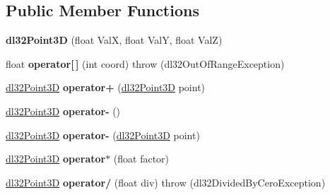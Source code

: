 \subsection*{Public Member Functions}
\begin{DoxyCompactItemize}
\item 
\hypertarget{structdl32_point3_d_a3dfca17d96b6cfa75a4110247c59c6e3}{{\bfseries dl32\-Point3\-D} (float Val\-X, float Val\-Y, float Val\-Z)}\label{structdl32_point3_d_a3dfca17d96b6cfa75a4110247c59c6e3}

\item 
\hypertarget{structdl32_point3_d_a066d3694ca763e334a21e962fc6315b9}{float {\bfseries operator\mbox{[}$\,$\mbox{]}} (int coord)  throw (dl32\-Out\-Of\-Range\-Exception)}\label{structdl32_point3_d_a066d3694ca763e334a21e962fc6315b9}

\item 
\hypertarget{structdl32_point3_d_aaad092a6e2481fdcb768b4f61bb8612d}{\hyperlink{structdl32_point3_d}{dl32\-Point3\-D} {\bfseries operator+} (\hyperlink{structdl32_point3_d}{dl32\-Point3\-D} point)}\label{structdl32_point3_d_aaad092a6e2481fdcb768b4f61bb8612d}

\item 
\hypertarget{structdl32_point3_d_a548a2681b98fbb0d2175ffd5a79da088}{\hyperlink{structdl32_point3_d}{dl32\-Point3\-D} {\bfseries operator-\/} ()}\label{structdl32_point3_d_a548a2681b98fbb0d2175ffd5a79da088}

\item 
\hypertarget{structdl32_point3_d_ac504bbd6cdc3b88366ef6a73f135dbb9}{\hyperlink{structdl32_point3_d}{dl32\-Point3\-D} {\bfseries operator-\/} (\hyperlink{structdl32_point3_d}{dl32\-Point3\-D} point)}\label{structdl32_point3_d_ac504bbd6cdc3b88366ef6a73f135dbb9}

\item 
\hypertarget{structdl32_point3_d_a86d23fa11f2b777bf680a983c3d56ab6}{\hyperlink{structdl32_point3_d}{dl32\-Point3\-D} {\bfseries operator$\ast$} (float factor)}\label{structdl32_point3_d_a86d23fa11f2b777bf680a983c3d56ab6}

\item 
\hypertarget{structdl32_point3_d_a6226dbe21fe4bc57e3a8f8889f8d7634}{\hyperlink{structdl32_point3_d}{dl32\-Point3\-D} {\bfseries operator/} (float div)  throw (dl32\-Divided\-By\-Cero\-Exception)}\label{structdl32_point3_d_a6226dbe21fe4bc57e3a8f8889f8d7634}

\end{DoxyCompactItemize}
